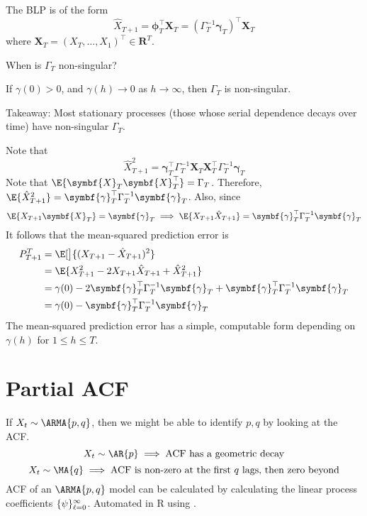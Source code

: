 The BLP is of the form
\[ \hat{X}_{T+1}=\symbf{\phi}_T^\top \symbf{X}_T=(\Gamma_T^{-1}\symbf{\gamma}_T)^\top \symbf{X}_T \]
where $ \symbf{X}_T=(X_{T},\ldots,X_1)^\top\in \mathbf{R}^T $.

When is $ \Gamma_T $ non-singular?
\begin{Theorem}{}{}
    If $ \gamma(0)>0 $, and $ \gamma(h)\to 0 $ as $ h\to\infty $, then
    $ \Gamma_T $ is non-singular.
\end{Theorem}
Takeaway: Most stationary processes (those whose serial dependence decays
over time) have non-singular $ \Gamma_T $.

Note that
\[ \hat{X}_{T+1}^2=\symbf{\gamma}_T^\top \Gamma_T^{-1}\symbf{X}_T \symbf{X}_T^\top
    \Gamma_T^{-1}\symbf{\gamma}_T \]
Note that $ \E{\symbf{X}_T \symbf{X}_T^\top}=\Gamma_T $.
Therefore, $ \E{\hat{X}_{T+1}^2}=\symbf{\gamma}_T^\top \Gamma_T^{-1} \symbf{\gamma}_T $.
Also, since
\[ \E{X_{T+1}\symbf{X}_T}=\symbf{\gamma}_T\implies
    \E{X_{T+1}\hat{X}_{T+1}}=\symbf{\gamma}_T^\top \Gamma_T^{-1}\symbf{\gamma}_T \]
It follows that the mean-squared prediction error is
\begin{align*}
    P_{T+1}^T
     & =\E[\big]{(X_{T+1}-\hat{X}_{T+1})^2}                                                                                 \\
     & =\E{X_{T+1}^2-2 X_{T+1}\hat{X}_{T+1}+\hat{X}_{T+1}^2}                                                                \\
     & =\gamma(0)-2 \symbf{\gamma}_T^\top \Gamma_T^{-1}\symbf{\gamma}_T+\symbf{\gamma}_T^\top \Gamma_T^{-1}\symbf{\gamma}_T \\
     & =\gamma(0)-\symbf{\gamma}_T^\top\Gamma_T^{-1}\symbf{\gamma}_T
\end{align*}
The mean-squared prediction error has a simple, computable
form depending on $ \gamma(h) $ for $ 1\le h\le T $.

\section{Partial ACF}
If $ X_t \sim \ARMA{p,q} $, then we might be able to identify
$ p,q $ by looking at the ACF\@.
\[ X_t \sim \AR{p}\implies\text{ACF has a geometric decay} \]
\[ X_t \sim \MA{q}\implies\text{ACF is non-zero at the first $q$ lags, then zero beyond} \]
ACF of an $ \ARMA{p,q} $ model can be calculated by calculating
the linear process coefficients $ \{\psi\}_{\ell=0}^\infty $.
Automated in R using .

